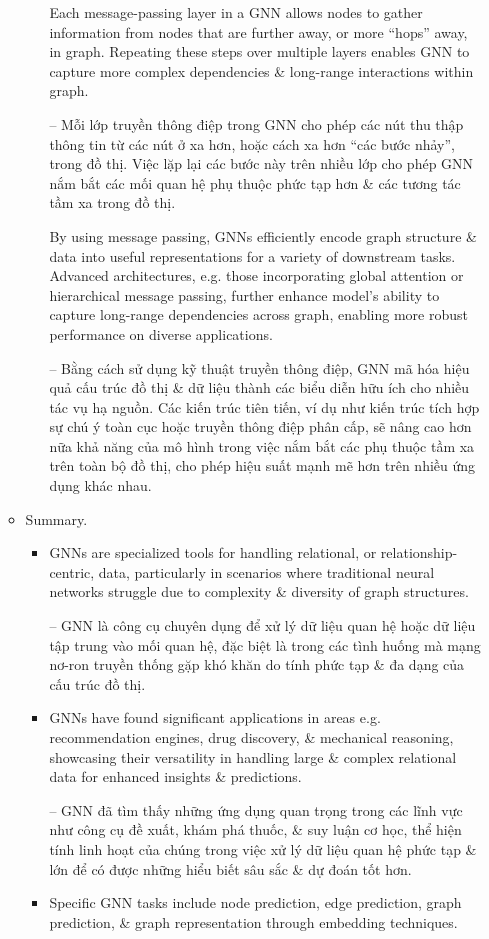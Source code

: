\documentclass{article}
\begin{document}
\begin{itemize}
\begin{itemize}
\begin{itemize}
            Each message-passing layer in a GNN allows nodes to gather information from nodes that are further away, or more ``hops'' away, in graph. Repeating these steps over multiple layers enables GNN to capture more complex dependencies \& long-range interactions within graph.

            -- Mỗi lớp truyền thông điệp trong GNN cho phép các nút thu thập thông tin từ các nút ở xa hơn, hoặc cách xa hơn ``các bước nhảy'', trong đồ thị. Việc lặp lại các bước này trên nhiều lớp cho phép GNN nắm bắt các mối quan hệ phụ thuộc phức tạp hơn \& các tương tác tầm xa trong đồ thị.

            By using message passing, GNNs efficiently encode graph structure \& data into useful representations for a variety of downstream tasks. Advanced architectures, e.g. those incorporating global attention or hierarchical message passing, further enhance model's ability to capture long-range dependencies across graph, enabling more robust performance on diverse applications.

            -- Bằng cách sử dụng kỹ thuật truyền thông điệp, GNN mã hóa hiệu quả cấu trúc đồ thị \& dữ liệu thành các biểu diễn hữu ích cho nhiều tác vụ hạ nguồn. Các kiến trúc tiên tiến, ví dụ như kiến trúc tích hợp sự chú ý toàn cục hoặc truyền thông điệp phân cấp, sẽ nâng cao hơn nữa khả năng của mô hình trong việc nắm bắt các phụ thuộc tầm xa trên toàn bộ đồ thị, cho phép hiệu suất mạnh mẽ hơn trên nhiều ứng dụng khác nhau.
        \end{itemize}
        \item {\sf Summary.}
        \begin{itemize}
            \item GNNs are specialized tools for handling relational, or relationship-centric, data, particularly in scenarios where traditional neural networks struggle due to complexity \& diversity of graph structures.

            -- GNN là công cụ chuyên dụng để xử lý dữ liệu quan hệ hoặc dữ liệu tập trung vào mối quan hệ, đặc biệt là trong các tình huống mà mạng nơ-ron truyền thống gặp khó khăn do tính phức tạp \& đa dạng của cấu trúc đồ thị.
            \item GNNs have found significant applications in areas e.g. recommendation engines, drug discovery, \& mechanical reasoning, showcasing their versatility in handling large \& complex relational data for enhanced insights \& predictions.

            -- GNN đã tìm thấy những ứng dụng quan trọng trong các lĩnh vực như công cụ đề xuất, khám phá thuốc, \& suy luận cơ học, thể hiện tính linh hoạt của chúng trong việc xử lý dữ liệu quan hệ phức tạp \& lớn để có được những hiểu biết sâu sắc \& dự đoán tốt hơn.
            \item Specific GNN tasks include node prediction, edge prediction, graph prediction, \& graph representation through embedding techniques.


\end{itemize}
\end{itemize}
\end{itemize}
\end{document}

